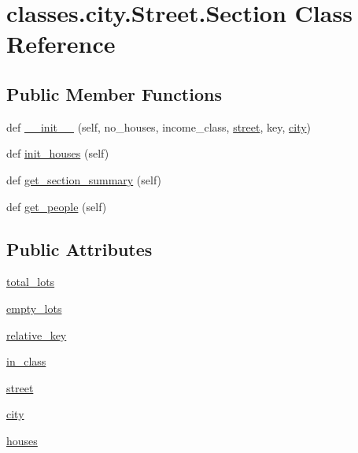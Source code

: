 \hypertarget{classclasses_1_1city_1_1Street_1_1Section}{}\section{classes.\+city.\+Street.\+Section Class Reference}
\label{classclasses_1_1city_1_1Street_1_1Section}
\subsection*{Public Member Functions}
\begin{DoxyCompactItemize}
\item 
def \hyperlink{classclasses_1_1city_1_1Street_1_1Section_a1243d4882aba3cbfd887c264b3bc704a}{\+\_\+\+\_\+init\+\_\+\+\_\+} (self, no\+\_\+houses, income\+\_\+class, \hyperlink{classclasses_1_1city_1_1Street_1_1Section_aa555c003cfb42b4e382ddbfdc4fd0966}{street}, key, \hyperlink{classclasses_1_1city_1_1Street_1_1Section_a7c94255fd6393f73b76dad2ace64ffbf}{city})
\item 
def \hyperlink{classclasses_1_1city_1_1Street_1_1Section_aa686a6553d0ea8d5f824f0ed8ad22522}{init\+\_\+houses} (self)
\item 
def \hyperlink{classclasses_1_1city_1_1Street_1_1Section_a4153571095773bdb18de669925197c8d}{get\+\_\+section\+\_\+summary} (self)
\item 
def \hyperlink{classclasses_1_1city_1_1Street_1_1Section_a3b6ff60ab37402bcf754ad61c18efaf3}{get\+\_\+people} (self)
\end{DoxyCompactItemize}
\subsection*{Public Attributes}
\begin{DoxyCompactItemize}
\item 
\hyperlink{classclasses_1_1city_1_1Street_1_1Section_acd9476f27c62d887ada9d4a20ff06e2b}{total\+\_\+lots}
\item 
\hyperlink{classclasses_1_1city_1_1Street_1_1Section_afac24888295b36580f1b460a54df4f9b}{empty\+\_\+lots}
\item 
\hyperlink{classclasses_1_1city_1_1Street_1_1Section_ae42b56589f940791cf11d928adf06c09}{relative\+\_\+key}
\item 
\hyperlink{classclasses_1_1city_1_1Street_1_1Section_a86633797f7c0095649b31e38d5f97c99}{in\+\_\+class}
\item 
\hyperlink{classclasses_1_1city_1_1Street_1_1Section_aa555c003cfb42b4e382ddbfdc4fd0966}{street}
\item 
\hyperlink{classclasses_1_1city_1_1Street_1_1Section_a7c94255fd6393f73b76dad2ace64ffbf}{city}
\item 
\hyperlink{classclasses_1_1city_1_1Street_1_1Section_a996e7904ab49e69cf5ce43f808b577fa}{houses}
\end{DoxyCompactItemize}


